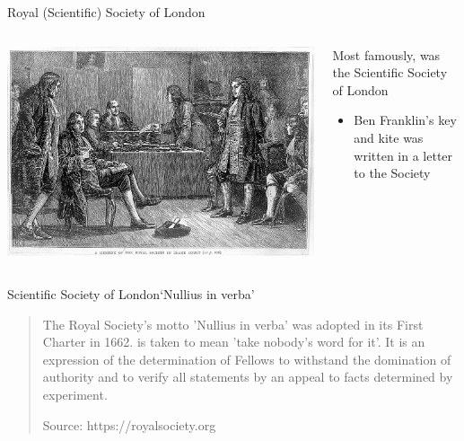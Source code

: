 \documentclass[aspectratio=169,t,11pt,table]{beamer}
\begin{document}
\begin{frame}{Royal (Scientific) Society of London}
  \begin{columns}[T]
    \begin{column}{.55\textwidth}\vspace*{-\bigskipamount}
      \begin{center}
        \includegraphics[width = \textwidth]{figures/royal_society.jpg}
      \end{center}
    \end{column}
    \begin{column}{.45\textwidth}
      Most famously, was the Scientific Society of London
      \begin{itemize}
        \item Ben Franklin's key and kite was written in a letter to the Society
      \end{itemize}
    \end{column}
  \end{columns}
\end{frame}

\begin{frame}{Scientific Society of London}{`Nullius in verba'}
  \begin{quote}
    The Royal Society's motto 'Nullius in verba' was adopted in its First Charter in 1662. is taken to mean 'take nobody's word for it'. It is an expression of the determination of Fellows to withstand the domination of authority and to verify all statements by an appeal to facts determined by experiment.

    Source: https://royalsociety.org
  \end{quote}
\end{frame}
\end{document}
